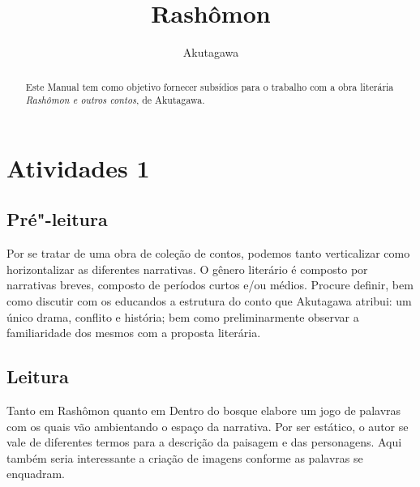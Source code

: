 \documentclass[12pt]{extarticle}
\begin{document}
\newcommand{\AutorLivro}{Akutagawa}
\newcommand{\TituloLivro}{Rashômon}
\newcommand{\Tema}{Ficção, mistério e fantasia}
\newcommand{\Genero}{Conto, crônica e novela}
\newcommand{\imagemCapa}{./images/PNLD0009-01.png}
\newcommand{\issnppub}{---}
\newcommand{\issnepub}{---}
\newcommand{\colaborador}{\textbf{Cesar Augusto Araujo Oyakawa, Bruno Gradella e Vicente Castro} é uma pessoa incrível e vai fazer um bom serviço.}


\title{\TituloLivro}
\author{\AutorLivro}
\def\authornotes{\colaborador}

\date{}
\maketitle

\begin{abstract}
Este Manual tem como objetivo fornecer subsídios para o trabalho com a
obra literária \emph{Rashômon e outros contos}, de Akutagawa.
\end{abstract}

\tableofcontents


\section{Atividades 1}


\subsection{Pré"-leitura}


Por se tratar de uma obra de coleção de contos, podemos
tanto verticalizar como horizontalizar as diferentes narrativas. O
gênero literário é composto por narrativas breves, composto de períodos
curtos e/ou médios. Procure definir, bem como discutir com os educandos
a estrutura do conto que Akutagawa atribui: um único drama, conflito e
história; bem como preliminarmente observar a familiaridade dos mesmos
com a proposta literária.

\subsection{Leitura}


Tanto em Rashômon quanto em Dentro do bosque elabore um jogo
de palavras com os quais vão ambientando o espaço da narrativa. Por ser
estático, o autor se vale de diferentes termos para a descrição da
paisagem e das personagens. Aqui também seria interessante a criação de
imagens conforme as palavras se enquadram.
\end{document}
